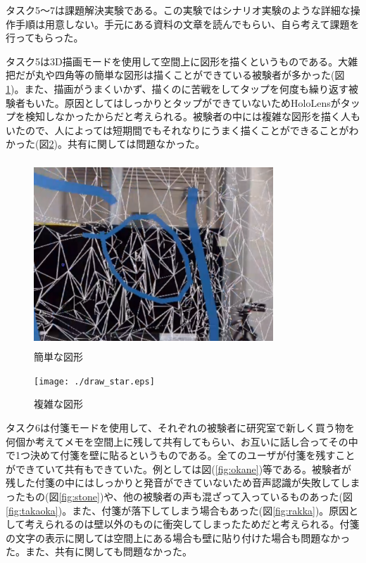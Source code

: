\documentclass[11pt,a4j, titlepage]{jarticle} %
\begin{document}
タスク5～7は課題解決実験である。この実験ではシナリオ実験のような詳細な操作手順は用意しない。手元にある資料の文章を読んでもらい、自ら考えて課題を行ってもらった。

タスク5は3D描画モードを使用して空間上に図形を描くというものである。大雑把だが丸や四角等の簡単な図形は描くことができている被験者が多かった(図\ref{fig:draw_maru})。また、描画がうまくいかず、描くのに苦戦をしてタップを何度も繰り返す被験者もいた。原因としてはしっかりとタップができていないためHoloLensがタップを検知しなかったからだと考えられる。被験者の中には複雑な図形を描く人もいたので、人によっては短期間でもそれなりにうまく描くことができることがわかった(図\ref{fig:draw_star})。共有に関しては問題なかった。

\begin{figure}[H]
  \begin{center}
    \includegraphics[clip,height=7.0cm,width=9.0cm]{./draw_maru.eps}
    \caption{簡単な図形}
    \label{fig:draw_maru}
  \end{center}
\end{figure}

\begin{figure}[H]
  \begin{center}
    \texttt{[image: ./draw\_star.eps]}
    \caption{複雑な図形}
    \label{fig:draw_star}
  \end{center}
\end{figure}

タスク6は付箋モードを使用して、それぞれの被験者に研究室で新しく買う物を何個か考えてメモを空間上に残して共有してもらい、お互いに話し合ってその中で1つ決めて付箋を壁に貼るというものである。全てのユーザが付箋を残すことができていて共有もできていた。例としては図(\ref{fig:okane})等である。被験者が残した付箋の中にはしっかりと発音ができていないため音声認識が失敗してしまったもの(図\ref{fig:stone})や、他の被験者の声も混ざって入っているものあった(図\ref{fig:takaoka})。また、付箋が落下してしまう場合もあった(図\ref{fig:rakka})。原因として考えられるのは壁以外のものに衝突してしまったためだと考えられる。付箋の文字の表示に関しては空間上にある場合も壁に貼り付けた場合も問題なかった。また、共有に関しても問題なかった。
\end{document}
